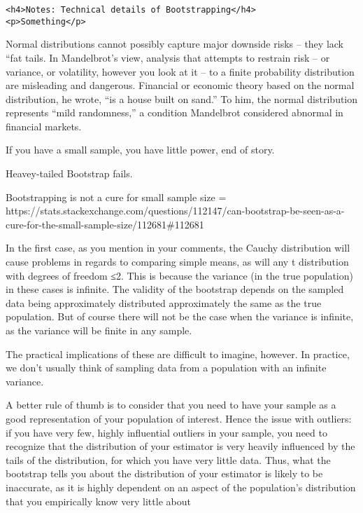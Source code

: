 \documentclass[11pt]{article}
\begin{document}
    \hypertarget{detailed_bootstrap}{}

\begin{verbatim}
<h4>Notes: Technical details of Bootstrapping</h4>
<p>Something</p>
\end{verbatim}

Normal distributions cannot possibly capture major downside risks --
they lack ``fat tails. In Mandelbrot's view, analysis that attempts to
restrain risk -- or variance, or volatility, however you look at it --
to a finite probability distribution are misleading and dangerous.
Financial or economic theory based on the normal distribution, he wrote,
``is a house built on sand.'' To him, the normal distribution represents
``mild randomness,'' a condition Mandelbrot considered abnormal in
financial markets.

If you have a small sample, you have little power, end of story.

Heavey-tailed Bootstrap fails.

Bootstrapping is not a cure for small sample size =
https://stats.stackexchange.com/questions/112147/can-bootstrap-be-seen-as-a-cure-for-the-small-sample-size/112681\#112681

In the first case, as you mention in your comments, the Cauchy
distribution will cause problems in regards to comparing simple means,
as will any t distribution with degrees of freedom ≤2. This is because
the variance (in the true population) in these cases is infinite. The
validity of the bootstrap depends on the sampled data being
approximately distributed approximately the same as the true population.
But of course there will not be the case when the variance is infinite,
as the variance will be finite in any sample.

The practical implications of these are difficult to imagine, however.
In practice, we don't usually think of sampling data from a population
with an infinite variance.

A better rule of thumb is to consider that you need to have your sample
as a good representation of your population of interest. Hence the issue
with outliers: if you have very few, highly influential outliers in your
sample, you need to recognize that the distribution of your estimator is
very heavily influenced by the tails of the distribution, for which you
have very little data. Thus, what the bootstrap tells you about the
distribution of your estimator is likely to be inaccurate, as it is
highly dependent on an aspect of the population's distribution that you
empirically know very little about
\end{document}
